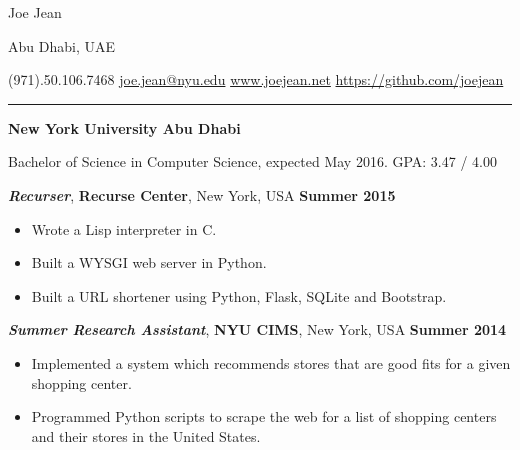 \documentclass[11pt]{article} %
\begin{document}
\centerline{{\Huge \sc Joe Jean}}  %
\centerline{Abu Dhabi, UAE}
\centerline{(971).50.106.7468 \textbar \hspace{2pt}\href{mailto:joe.jean@nyu.edu}{joe.jean@nyu.edu} \textbar \hspace{2pt}\url{www.joejean.net} \textbar \hspace{2pt}\url{https://github.com/joejean} } 
\noindent
\rule{\textwidth}{1pt}\bigskip

\medskip

\noindent \centerline{\normalsize \bf New York University Abu Dhabi \hfill }
Bachelor of Science in Computer Science, expected May 2016. GPA: 3.47 / 4.00\\

 \medskip

\noindent \centerline{\large \textbf{\textit{Recurser}}, \textbf {Recurse Center}, New York, USA \hfill \textbf{Summer 2015}}
\begin{itemize}\itemsep-0.2em
  \item Wrote a Lisp interpreter in C. 
  \item Built a WYSGI web server in Python.
  \item Built a URL shortener using Python, Flask, SQLite and Bootstrap.
\end{itemize}
\noindent \centerline{\large \textbf{\textit{Summer Research Assistant}}, \textbf {NYU CIMS}, New York, USA \hfill \textbf{Summer 2014}}
\begin{itemize}\itemsep-0.2em
  \item Implemented a system which recommends stores that are good fits for a given shopping center.
  \item Programmed Python scripts to scrape the web for a list of shopping centers and their stores in the United States.
\end{itemize}
\medskip

\vspace{0.05in}
\end{document}

